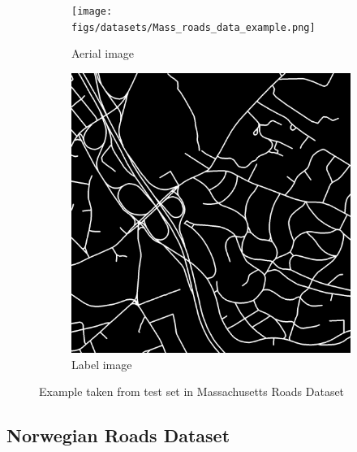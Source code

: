 \begin{figure}
\begin{subfigure}{0.48\textwidth}
\texttt{[image: figs/datasets/Mass\_roads\_data\_example.png]}
\caption{Aerial image} \label{fig:mass_roads_example_data}
\end{subfigure}
\hspace*{\fill} %
\begin{subfigure}{0.48\textwidth}
\includegraphics[width=\linewidth]{figs/datasets/Mass_roads_label_example.png}
\caption{Label image} \label{fig:mass_roads_example_label}
\end{subfigure}
\hspace*{\fill} %
\caption{Example taken from test set in Massachusetts Roads Dataset} \label{fig:mass_roads_example}
\end{figure}





\subsection{Norwegian Roads Dataset}

